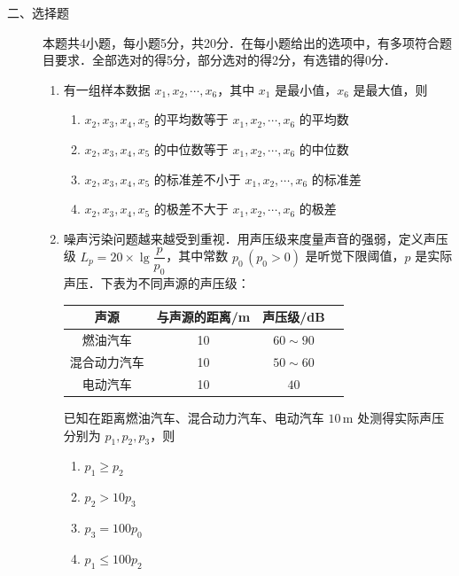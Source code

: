 \begin{description}
    \item[二、选择题] 本题共4小题，每小题5分，共20分．在每小题给出的选项中，有多项符合题目要求．全部选对的得5分，部分选对的得2分，有选错的得0分．
    \begin{enumerate}[leftmargin=5pt]
      \addtocounter{enumi}{+8}
        \item 有一组样本数据 $x_1,x_2,\cdots,x_6$，其中 $x_1$ 是最小值，$x_6$ 是最大值，则
        \begin{enumerate}[label=\Alph*.]
            \item $x_2,x_3,x_4,x_5$ 的平均数等于 $x_1,x_2,\cdots,x_6$ 的平均数
            \item $x_2,x_3,x_4,x_5$ 的中位数等于 $x_1,x_2,\cdots,x_6$ 的中位数
            \item $x_2,x_3,x_4,x_5$ 的标准差不小于 $x_1,x_2,\cdots,x_6$ 的标准差
            \item $x_2,x_3,x_4,x_5$ 的极差不大于 $x_1,x_2,\cdots,x_6$ 的极差
        \end{enumerate}

        \item 噪声污染问题越来越受到重视．用声压级来度量声音的强弱，定义声压级 $L_p=20\times\lg\dfrac{p}{p_0}$，其中常数 $p_0\,(p_0>0)$ 是听觉下限阈值，$p$ 是实际声压．下表为不同声源的声压级：
        
        \begin{center}
        \begin{tabular}{c|c|c|c}
        \hline
        声源 & 与声源的距离/m & 声压级/dB \\
        \hline
        燃油汽车 & 10 & $60\sim90$ \\
        混合动力汽车 & 10 & $50\sim60$ \\
        电动汽车 & 10 & $40$ \\
        \hline
        \end{tabular}
        \end{center}

        已知在距离燃油汽车、混合动力汽车、电动汽车 $10\,\text{m}$ 处测得实际声压分别为 $p_1,p_2,p_3$，则
        \begin{enumerate}[label=\Alph*.]
            \item $p_1\geqslant p_2$
            \item $p_2>10p_3$
            \item $p_3=100p_0$
            \item $p_1\leqslant100p_2$
        \end{enumerate}


\end{enumerate}
\end{description}
